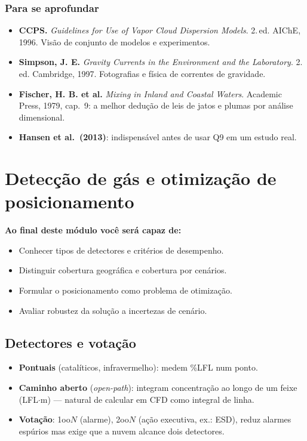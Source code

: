 \documentclass[10pt,a4paper,twocolumn,openany]{report}
\newenvironment{conceito}[1]{\section{#1}}{\par}
\newenvironment{aprofundar}{\subsection*{\textcolor{amarelo}{Para se aprofundar}}\small}{\par}
\newcommand{\objetivos}{\noindent\textbf{Ao final deste módulo você será capaz de:}}
\begin{document}
\begin{aprofundar}
\begin{itemize}[leftmargin=*]
  \item \textbf{CCPS.} \emph{Guidelines for Use of Vapor Cloud Dispersion Models}. 2.\,ed. AIChE, 1996. Visão de conjunto de modelos e experimentos.
  \item \textbf{Simpson, J. E.} \emph{Gravity Currents in the Environment and the Laboratory}. 2.\,ed. Cambridge, 1997. Fotografias e física de correntes de gravidade.
  \item \textbf{Fischer, H. B. et al.} \emph{Mixing in Inland and Coastal Waters}. Academic Press, 1979, cap.\ 9: a melhor dedução de leis de jatos e plumas por análise dimensional.
  \item \textbf{Hansen et al.\ (2013)}: indispensável antes de usar Q9 em um estudo real.
\end{itemize}
\end{aprofundar}

\chapter{Detecção de gás e otimização de posicionamento}

\objetivos
\begin{itemize}
  \item Conhecer tipos de detectores e critérios de desempenho.
  \item Distinguir cobertura geográfica e cobertura por cenários.
  \item Formular o posicionamento como problema de otimização.
  \item Avaliar robustez da solução a incertezas de cenário.
\end{itemize}

\begin{conceito}{Detectores e votação}
\begin{itemize}
  \item \textbf{Pontuais} (catalíticos, infravermelho): medem \%LFL num ponto.
  \item \textbf{Caminho aberto} (\emph{open-path}): integram concentração ao
        longo de um feixe (LFL$\cdot$m) --- natural de calcular em CFD como
        integral de linha.
  \item \textbf{Votação}: 1oo$N$ (alarme), 2oo$N$ (ação executiva, ex.: ESD),
        reduz alarmes espúrios mas exige que a nuvem alcance dois detectores.
\end{itemize}
\end{conceito}
\end{document}
